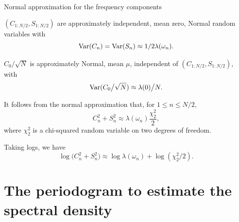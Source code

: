 \begin{frame}[fragile]{Normal approximation for the frequency components}

\bi

\item  $(C_{1:N/2},S_{1:N/2})$ are approximately independent, mean zero, Normal random variables with
\begin{equation} \mathrm{Var}(C_n) = \mathrm{Var}(S_n) \approx 1/2 \lambda(\omega_n).\end{equation}

\item  $C_0\big/ \sqrt{N}$ is approximately Normal, mean $\mu$, independent of $(C_{1:N/2},S_{1:N/2})$, with
\begin{equation}\mathrm{Var}(C_0\big/ \sqrt{N}) \approx \lambda(0)\big/ N.\end{equation}



\item  It follows from the normal approximation that, for $1\le n\le N/2$,
\begin{equation}
\label{eq:cs:chi-squared}
C_n^2 + S_n^2 \approx \lambda(\omega_n) \frac{\chi^2_2}{2},\end{equation}
where $\chi^2_2$ is a chi-squared random variable on two degrees of freedom.

\item  Taking logs, we have
\begin{equation}
\label{eq:cs:log-chi-squared}
\log\big(C_n^2 + S_n^2 \big) \approx \log \lambda(\omega_n) + \log(\chi^2_2/2).\end{equation}

\ei
\end{frame}

\section{The periodogram to estimate the spectral density}

